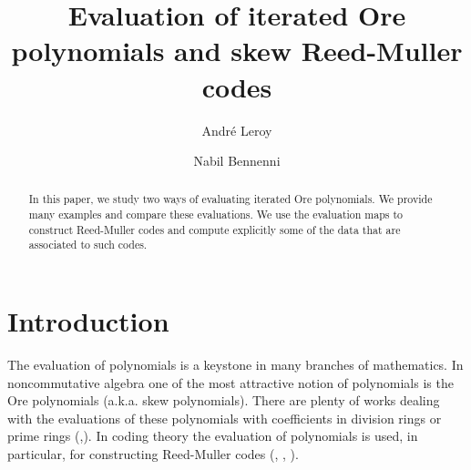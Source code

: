 \documentclass{amsproc}
\numberwithin{equation}{section}
\begin{document}
\title{ Evaluation of iterated Ore polynomials and skew Reed-Muller codes}

\author{Andr\'e Leroy}
\address{ Université Artois, UR 2462, Laboratoire de Mathématiques de Lens (LML), F-62300 Lens, France}

\author{ Nabil Bennenni}
\address{USTHB, Facult\'{e} de Math\'{e}matiques\\
	BP 32 El Alia Bab Ezzouar Algiers Algeria}




\begin{abstract}
 In this paper, we study two ways of evaluating iterated Ore polynomials.  We provide many examples and compare these evaluations.  We use the evaluation maps to construct Reed-Muller codes and compute explicitly some of the data that are associated to such codes.
\end{abstract}

\maketitle

\section*{ Introduction}
The evaluation of polynomials is a keystone in many branches of mathematics.   In noncommutative algebra one of the most attractive notion of polynomials is the Ore polynomials (a.k.a. skew polynomials).  There are plenty of works dealing with the evaluations of these polynomials with coefficients in division rings or prime rings (\cite{L2},\cite{LLO}).  In coding theory the evaluation of polynomials is used, in particular, for constructing Reed-Muller codes (\cite{bib4}, \cite{bib1}, \cite{bib5}).
\end{document}
